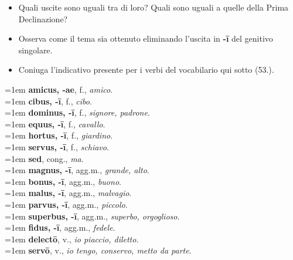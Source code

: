 \documentclass[nols]{tufte-handout}
\newcommand{\textls}[2][5]{%
    \begingroup\addfontfeatures{LetterSpace=#1}#2\endgroup
  }
\renewcommand{\smallcapsspacing}[1]{\textls[10]{#1}}
\renewcommand{\textsc}[1]{\smallcapsspacing{\textsmallcaps{#1}}}
\begin{document}
\begin{itemize}
\item[\textsc{1.}] Quali uscite sono uguali tra di loro? Quali sono uguali a quelle della Prima Declinazione?  
\item[\textsc{2.}] Osserva come il tema sia ottenuto eliminando l'uscita in \textbf{-ī} del genitivo singolare. 
\item[\textsc{3.}] Coniuga l'indicativo presente per i verbi del vocabilario qui sotto (53.).  
\end{itemize}



\begin{multicols}{2}
    \noindent \hangindent=1em \textbf{amicus, -ae}, f., \textit{amico}.  \\
    \noindent \hangindent=1em \textbf{cibus, -ī}, f., \textit{cibo}.  \\
	\noindent \hangindent=1em \textbf{dominus, -ī}, f., \textit{signore, padrone}.  \\
	\noindent \hangindent=1em \textbf{equus, -ī}, f., \textit{cavallo}.  \\
	\noindent \hangindent=1em \textbf{hortus, -ī}, f., \textit{giardino}.  \\
	\noindent \hangindent=1em \textbf{servus, -ī}, f., \textit{schiavo}.  \\
	
	\noindent \hangindent=1em \textbf{sed}, cong., \textit{ma}.  \\
	
	\noindent \hangindent=1em \textbf{magnus, -ī}, agg.m., \textit{grande, alto}.  \\
	\noindent \hangindent=1em \textbf{bonus, -ī}, agg.m., \textit{buono}.  \\
	\noindent \hangindent=1em \textbf{malus, -ī}, agg.m., \textit{malvagio}.  \\
	\noindent \hangindent=1em \textbf{parvus, -ī}, agg.m., \textit{piccolo}.  \\
	\noindent \hangindent=1em \textbf{superbus, -ī}, agg.m., \textit{superbo, orgoglioso}.  \\
	\noindent \hangindent=1em \textbf{fidus, -ī}, agg.m., \textit{fedele}.  \\
	
	\noindent \hangindent=1em \textbf{delectō}, v., \textit{io piaccio, diletto}.  \\
	\noindent \hangindent=1em \textbf{servō}, v., \textit{io tengo, conservo, metto da parte}.  \\
	
\end{multicols}
\end{document}
